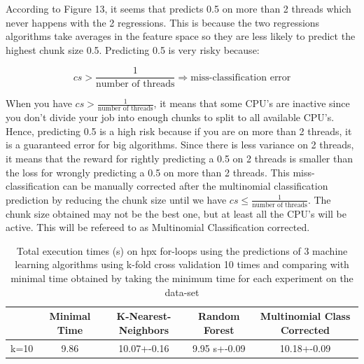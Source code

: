 According to Figure 13, it seems that predicts 0.5 on more than 2 threads which never happens with the 2 regressions. This is because the two regressions algorithms take averages in the feature space so they are less likely to predict the highest chunk size 0.5. Predicting 0.5 is very risky because:

$$cs>\frac{1}{\text{number of threads}} \Rightarrow \text{miss-classification error}$$

 When you have $cs>\frac{1}{\text{number of threads}}$, it means that some CPU's are inactive since you don't divide your job into enough chunks to split to all available CPU's. Hence, predicting 0.5 is a high risk because if you are on more than 2 threads, it is a guaranteed error for big algorithms. Since there is less variance on 2 threads, it means that the reward for rightly predicting a  0.5 on 2 threads is smaller than the loss for wrongly predicting a 0.5 on more than 2 threads.
This miss-classification can be manually corrected after the multinomial classification prediction by reducing the chunk size until we have $cs\leq \frac{1}{\text{number of threads}}$. The chunk size obtained may not be the best one, but at least all the CPU's will be active. This will be refereed to as Multinomial Classification corrected.

\begin{table}[h]
	\centering
	\caption{Total execution times (s) on hpx for-loops using the predictions of 3 machine learning algorithms using k-fold cross validation 10 times and comparing with minimal time obtained by taking the minimum time for each experiment on the data-set}
	\label{my-label}
	\begin{tabular}{|c|c|c|c|c|}
		\hline
		& Minimal Time &K-Nearest-Neighbors & Random Forest &Multinomial Class Corrected\\ \hline
		k=10 &9.86 & 10.07+-0.16  & 9.95 s+-0.09 & 10.18+-0.09\\ \hline
	\end{tabular}
\end{table}

